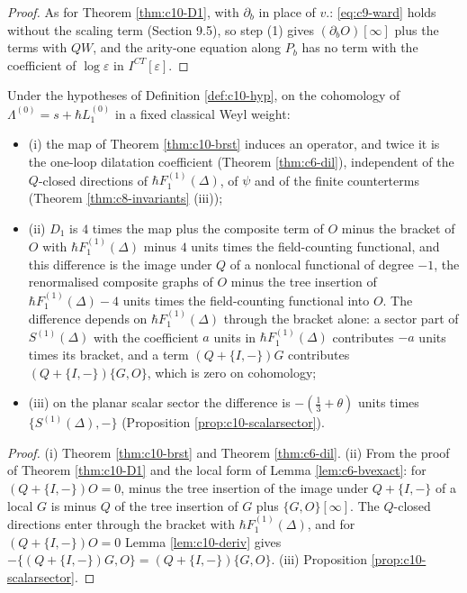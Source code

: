 \begin{proof}
As for Theorem \ref{thm:c10-D1}, with $\partial_b$ in place of $v.$: \eqref{eq:c9-ward} holds without the scaling term (Section 9.5), so step (1) gives $(\partial_bO)[\infty]$ plus the terms with $QW$, and the arity-one equation along $P_b$ has no term with the coefficient of $\log\varepsilon$ in $I^{CT}[\varepsilon]$.
\end{proof}

\begin{proposition}[Spectrum]
\label{prop:c10-spec}
Under the hypotheses of Definition \ref{def:c10-hyp}, on the cohomology of $\Lambda^{(0)}=s+\hbar L_1^{(0)}$ in a fixed classical Weyl weight:
\begin{itemize}
\item (i) the map of Theorem \ref{thm:c10-brst} induces an operator, and twice it is the one-loop dilatation coefficient (Theorem \ref{thm:c6-dil}), independent of the $Q$-closed directions of $\hbar F_1^{(1)}(\Delta)$, of $\psi$ and of the finite counterterms (Theorem \ref{thm:c8-invariants} (iii));
\item (ii) $D_1$ is $4$ times the map plus the composite term of $O$ minus the bracket of $O$ with $\hbar F_1^{(1)}(\Delta)$ minus $4$ units times the field-counting functional, and this difference is the image under $Q$ of a nonlocal functional of degree $-1$, the renormalised composite graphs of $O$ minus the tree insertion of $\hbar F_1^{(1)}(\Delta)-4$ units times the field-counting functional into $O$. The difference depends on $\hbar F_1^{(1)}(\Delta)$ through the bracket alone: a sector part of $S^{(1)}(\Delta)$ with the coefficient $a$ units in $\hbar F_1^{(1)}(\Delta)$ contributes $-a$ units times its bracket, and a term $(Q+\{I,-\})G$ contributes $(Q+\{I,-\})\{G,O\}$, which is zero on cohomology;
\item (iii) on the planar scalar sector the difference is $-(\tfrac13+\theta)$ units times $\{S^{(1)}(\Delta),-\}$ (Proposition \ref{prop:c10-scalarsector}).
\end{itemize}
\end{proposition}

\begin{proof}
(i) Theorem \ref{thm:c10-brst} and Theorem \ref{thm:c6-dil}. (ii) From the proof of Theorem \ref{thm:c10-D1} and the local form of Lemma \ref{lem:c6-bvexact}: for $(Q+\{I,-\})O=0$, minus the tree insertion of the image under $Q+\{I,-\}$ of a local $G$ is minus $Q$ of the tree insertion of $G$ plus $\{G,O\}[\infty]$. The $Q$-closed directions enter through the bracket with $\hbar F_1^{(1)}(\Delta)$, and for $(Q+\{I,-\})O=0$ Lemma \ref{lem:c10-deriv} gives $-\{(Q+\{I,-\})G,O\}=(Q+\{I,-\})\{G,O\}$. (iii) Proposition \ref{prop:c10-scalarsector}.
\end{proof}

